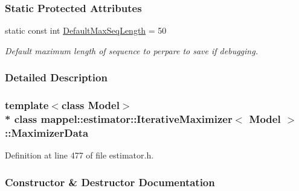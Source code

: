 \subsubsection*{Static Protected Attributes}
\begin{DoxyCompactItemize}
\item 
static const int \hyperlink{classmappel_1_1estimator_1_1IterativeMaximizer_1_1MaximizerData_a38e997edb1943f364f5ec1f997d5b254}{Default\+Max\+Seq\+Length} = 50
\begin{DoxyCompactList}\small\item\em Default maximum length of sequence to perpare to save if debugging. \end{DoxyCompactList}\end{DoxyCompactItemize}


\subsubsection{Detailed Description}
\subsubsection*{template$<$class Model$>$\\*
class mappel\+::estimator\+::\+Iterative\+Maximizer$<$ Model $>$\+::\+Maximizer\+Data}



Definition at line 477 of file estimator.\+h.



\subsubsection{Constructor \& Destructor Documentation}
